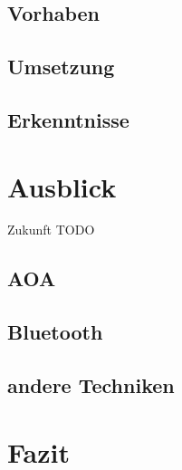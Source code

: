 \documentclass[12pt,journal,compsoc]{IEEEtran}
\begin{document}
\subsection{Vorhaben}

\subsection{Umsetzung}

\subsection{Erkenntnisse}


\section{Ausblick}
Zukunft TODO
\subsection{AOA}

\subsection{Bluetooth}
\subsection{andere Techniken}

\section{Fazit}








\end{document}
